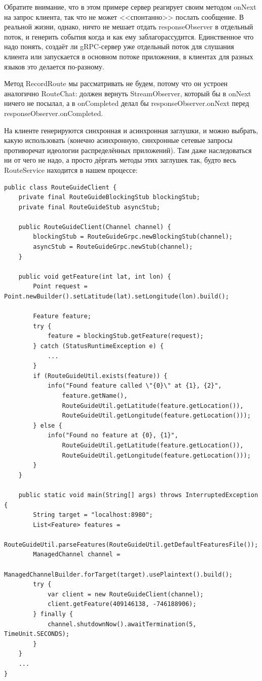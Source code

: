 \documentclass{../../text-style}
\begin{document}
Обратите внимание, что в этом примере сервер реагирует своим методом onNext на запрос клиента, так что не может <<спонтанно>> послать сообщение. В реальной жизни, однако, ничто не мешает отдать responseObserver в отдельный поток, и генерить события когда и как ему заблагорассудится. Единственное что надо понять, создаёт ли gRPC-сервер уже отдельный поток для слушания клиента или запускается в основном потоке приложения, в клиентах для разных языков это делается по-разному.

Метод RecordRoute мы рассматривать не будем, потому что он устроен аналогично RouteChat: должен вернуть StreamObserver, который бы в onNext ничего не посылал, а в onCompleted делал бы responseObserver.onNext перед responseObserver.onCompleted.

На клиенте генерируются синхронная и асинхронная заглушки, и можно выбрать, какую использовать (конечно асинхронную, синхронные сетевые запросы противоречат идеологии распределённых приложений). Там даже наследоваться ни от чего не надо, а просто дёргать методы этих заглушек так, будто весь RouteService находится в нашем процессе:

\begin{verbatim}
public class RouteGuideClient {
    private final RouteGuideBlockingStub blockingStub;
    private final RouteGuideStub asyncStub;

    public RouteGuideClient(Channel channel) {
        blockingStub = RouteGuideGrpc.newBlockingStub(channel);
        asyncStub = RouteGuideGrpc.newStub(channel);
    }

    public void getFeature(int lat, int lon) {
        Point request = Point.newBuilder().setLatitude(lat).setLongitude(lon).build();
        
        Feature feature;
        try {
            feature = blockingStub.getFeature(request);
        } catch (StatusRuntimeException e) {
            ...
        }
        if (RouteGuideUtil.exists(feature)) {
            info("Found feature called \"{0}\" at {1}, {2}",
                feature.getName(),
                RouteGuideUtil.getLatitude(feature.getLocation()),
                RouteGuideUtil.getLongitude(feature.getLocation()));
        } else {
            info("Found no feature at {0}, {1}",
                RouteGuideUtil.getLatitude(feature.getLocation()),
                RouteGuideUtil.getLongitude(feature.getLocation()));
        }
    }

    public static void main(String[] args) throws InterruptedException {
        String target = "localhost:8980";
        List<Feature> features = 
            RouteGuideUtil.parseFeatures(RouteGuideUtil.getDefaultFeaturesFile());
        ManagedChannel channel = 
            ManagedChannelBuilder.forTarget(target).usePlaintext().build();
        try {
            var client = new RouteGuideClient(channel);
            client.getFeature(409146138, -746188906);
        } finally {
            channel.shutdownNow().awaitTermination(5, TimeUnit.SECONDS);
        }
    }
    ...
}
\end{verbatim}
\end{document}
